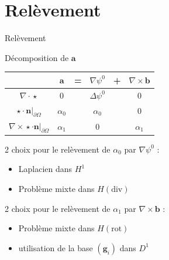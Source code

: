 \documentclass{beamer}
\newcommand{\grad}{{\nabla}}
\newcommand{\laplace}{{\Delta}}
\newcommand{\rot}{{\nabla\times}}
\renewcommand{\div}{{\nabla\cdot}}
\newcommand{\restr}{{\big\rvert_{\partial\Omega}}}
\begin{document}
\section{Relèvement}
\begin{frame}{Relèvement}
\label{psi0}
\begin{block}{Décomposition de $\mathbf{a}$}
\begin{center}
\begin{tabular}{c|ccccc}
& $\mathbf{a}$ & = & $\grad\psi^0$ & + & $\rot \mathbf{b}$ \\ \hline
$\div\star$ & 0 & & $\laplace\psi^0$ & & 0\\ \hline
$\star\cdot \mathbf{n}\restr$ & $\alpha_0$ & & $\alpha_0$ & & 0\\ \hline
$\rot\star\cdot \mathbf{n}\restr$ & $\alpha_1$ & & 0 & & $\alpha_1$
\end{tabular}
\end{center}
\end{block}
2 choix pour le relèvement de $\alpha_0$ par $\grad\psi^0$ :
\begin{itemize}
\item Laplacien dans $H^1$
\item Problème mixte dans $H(\mathrm{div})$
\end{itemize}
2 choix pour le relèvement de $\alpha_1$ par $\rot\mathbf{b}$ :
\begin{itemize}
\item Problème mixte dans $H(\mathrm{rot})$
\item utilisation de la base $(\mathbf{g}_i)$ dans $D^1$
\end{itemize}
\end{frame}
\end{document}
